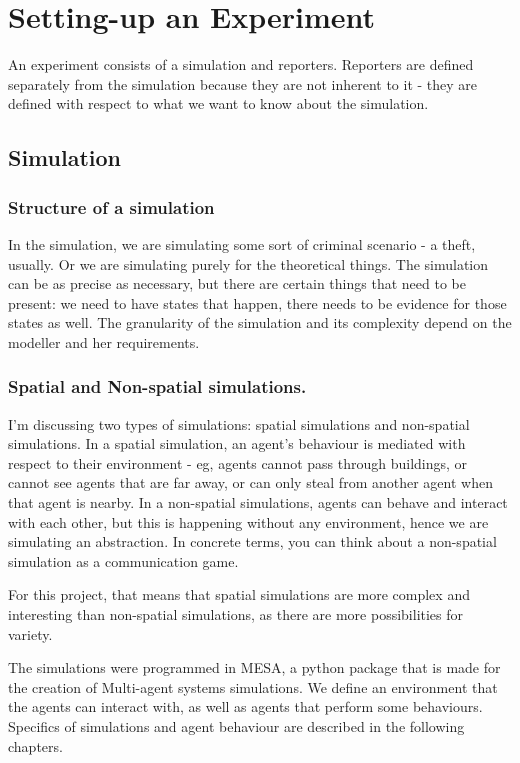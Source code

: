 \section{Setting-up an Experiment}
An experiment consists of a simulation and reporters. Reporters are defined separately from the simulation because they are not inherent to it - they are defined with respect to what we want to know about the simulation.

\subsection{Simulation}

\subsubsection{Structure of a simulation}
In the simulation, we are simulating some sort of criminal scenario - a theft, usually. Or we are simulating purely for the theoretical things. The simulation can be as precise as necessary, but there are certain things that need to be present: we need to have states that happen, there needs to be evidence for those states as well. The granularity of the simulation and its complexity depend on the modeller and her requirements.

\subsubsection{Spatial and Non-spatial simulations.}
I'm discussing two types of simulations: spatial simulations and non-spatial simulations. In a spatial simulation, an agent's behaviour is mediated with respect to their environment - eg, agents cannot pass through buildings, or cannot see agents that are far away, or can only steal from another agent when that agent is nearby. In a non-spatial simulations, agents can behave and interact with each other, but this is happening without any environment, hence we are simulating an abstraction. In concrete terms, you can think about a non-spatial simulation as a communication game.

For this project, that means that spatial simulations are more complex and interesting than non-spatial simulations, as there are more possibilities for variety.

The simulations were programmed in MESA, a python package that is made for the creation of Multi-agent systems simulations. We define an environment that the agents can interact with, as well as agents that perform some behaviours. Specifics of simulations and agent behaviour are described in the following chapters.

